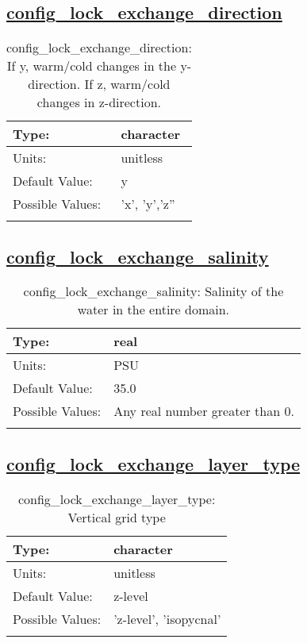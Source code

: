 \subsection[config\_lock\_exchange\_direction]{\hyperref[sec:nm_tab_lock_exchange]{config\_lock\_exchange\_direction}}
\label{subsec:nm_sec_config_lock_exchange_direction}
\begin{center}
\begin{longtable}{| p{2.0in} || p{4.0in} |}
    \hline
    Type: & character \\
    \hline
    Units: & \si{unitless} \\
    \hline
    Default Value: & y \\
    \hline
    Possible Values: & 'x', 'y','z'' \\
    \hline
    \caption{config\_lock\_exchange\_direction: If y, warm/cold changes in the y-direction.  If z, warm/cold changes in z-direction.}
\end{longtable}
\end{center}
\subsection[config\_lock\_exchange\_salinity]{\hyperref[sec:nm_tab_lock_exchange]{config\_lock\_exchange\_salinity}}
\label{subsec:nm_sec_config_lock_exchange_salinity}
\begin{center}
\begin{longtable}{| p{2.0in} || p{4.0in} |}
    \hline
    Type: & real \\
    \hline
    Units: & \si{PSU} \\
    \hline
    Default Value: & 35.0 \\
    \hline
    Possible Values: & Any real number greater than 0. \\
    \hline
    \caption{config\_lock\_exchange\_salinity: Salinity of the water in the entire domain.}
\end{longtable}
\end{center}
\subsection[config\_lock\_exchange\_layer\_type]{\hyperref[sec:nm_tab_lock_exchange]{config\_lock\_exchange\_layer\_type}}
\label{subsec:nm_sec_config_lock_exchange_layer_type}
\begin{center}
\begin{longtable}{| p{2.0in} || p{4.0in} |}
    \hline
    Type: & character \\
    \hline
    Units: & \si{unitless} \\
    \hline
    Default Value: & z-level \\
    \hline
    Possible Values: & 'z-level', 'isopycnal' \\
    \hline
    \caption{config\_lock\_exchange\_layer\_type: Vertical grid type}
\end{longtable}
\end{center}
